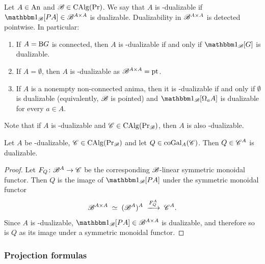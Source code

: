 \documentclass[english,svgnames,table]{article}
\begin{document}
    \begin{definition}
        Let $A \in \mathrm{An}$ and $\mathscr{B} \in \operatorname{CAlg}(\operatorname{Pr})$. We say that $A$ is \COB-dualizable if $\ounit_{\basecat}[\Path A] \in \basecat^{A \times A}$ is dualizable. Dualizability in $\mathscr{B}^{A\times A}$ is detected pointwise.
        In particular:
        \begin{enumerate}
            \item If $A = \mathrm{B} G$ is connected, then $A$ is \COB-dualizable if and only if $\ounit_{\basecat}[G]$ is dualizable.
            \item If $A = \emptyset$, then $A$ is \COB-dualizable as $\mathscr{B}^{A \times A} = \mathrm{pt}$.
            \item If $A$ is a nonempty non-connected anima, then it is \COB-dualizable if and only if $\emptyset$ is dualizable (equivalently, $\mathscr{B}$ is pointed) and $\ounit_{\basecat}[\Omega_a A]$ is dualizable for every $a \in A$.
        \end{enumerate}
    \end{definition}

    Note that if $A$ is \COB-dualizable and $\mathscr{C} \in \operatorname{CAlg}(\operatorname{Pr}_{\mathscr{B}})$, then $A$ is also \CO-dualizable.

    \begin{corollary}
    \label{cor:coGal-dualizable}
        Let $A$ be \COB-dualizable, $\mathscr{C} \in \operatorname{CAlg}(\operatorname{Pr}_{\mathscr{B}})$ and let $Q \in \mathrm{coGal}_A(\mathscr{C})$. Then $Q \in \mathscr{C}^A$ is dualizable.
    \end{corollary}
    \begin{proof}
        Let $F_Q \colon \mathscr{B}^A \to \mathscr{C}$ be the corresponding $\mathscr{B}$-linear symmetric monoidal functor. Then $Q$ is the image of $\ounit_{\basecat}[\Path A]$ under the symmetric monoidal functor
        \begin{equation*}
            \basecat^{A \times A} \;\simeq\; (\basecat^A)^A \;\xtoo{F_Q^A}\; \cC^A.
        \end{equation*}
        Since $A$ is \COB-dualizable, $\ounit_{\basecat}[\Path A] \in \basecat^{A \times A}$ is dualizable, and therefore so is $Q$ as its image under a symmetric monoidal functor.
    \end{proof}
    
    \subsubsection*{Projection formulas}
    
\end{document}
